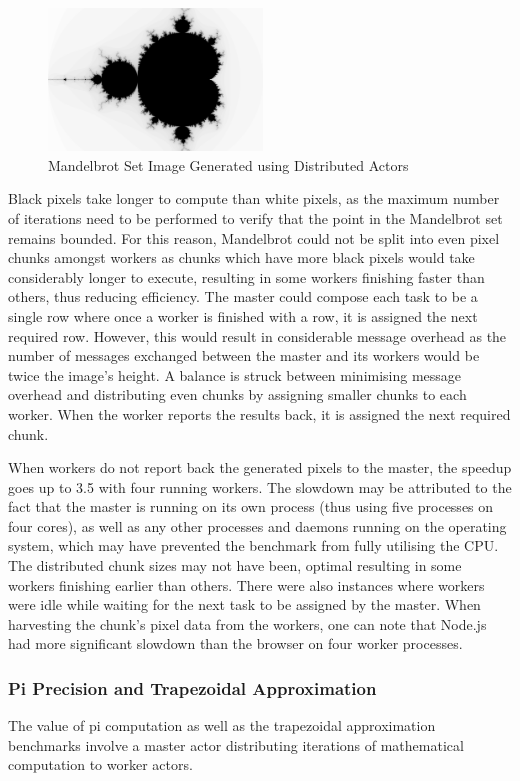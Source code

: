 \documentclass[oneside]{um-fict}
\begin{document}
\begin{figure}[H]
    \begin{centering}
        \includegraphics[width=215px]{resources/mandelbrot.png}
        \caption{Mandelbrot Set Image Generated using Distributed Actors}
    \end{centering}
\end{figure}
Black pixels take longer to compute than white pixels, as the maximum number of iterations need to be performed to verify that the point in the Mandelbrot set remains bounded. For this reason, Mandelbrot could not be split into even pixel chunks amongst workers as chunks which have more black pixels would take considerably longer to execute, resulting in some workers finishing faster than others, thus reducing efficiency. The master could compose each task to be a single row where once a worker is finished with a row, it is assigned the next required row. However, this would result in considerable message overhead as the number of messages exchanged between the master and its workers would be twice the image's height. A balance is struck between minimising message overhead and distributing even chunks by assigning smaller chunks to each worker. When the worker reports the results back, it is assigned the next required chunk.

When workers do not report back the generated pixels to the master, the speedup goes up to 3.5 with four running workers. The slowdown may be attributed to the fact that the master is running on its own process (thus using five processes on four cores), as well as any other processes and daemons running on the operating system, which may have prevented the benchmark from fully utilising the CPU. The distributed chunk sizes may not have been, optimal resulting in some workers finishing earlier than others. There were also instances where workers were idle while waiting for the next task to be assigned by the master. When harvesting the chunk's pixel data from the workers, one can note that Node.js had more significant slowdown than the browser on four worker processes.
\subsubsection{Pi Precision and Trapezoidal Approximation}
The value of pi computation as well as the trapezoidal approximation benchmarks involve a master actor distributing iterations of mathematical computation to worker actors.
\end{document}
